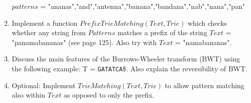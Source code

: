 \documentclass[11pt,runningheads,a4paper]{article}
\newcommand{\DNA}[1]{\texttt{\uppercase{#1}}}
\begin{document}
\begin{enumerate}
$patterns$ = "ananas","and","antenna","banana","bandana","nab","nana","pan"

\item Implement a function $PrefixTrieMatching(Text, Trie)$ which checks whether any string from $Patterns$ matches a prefix of the string $Text$ = "panamabananas" (see page 125). Also try with $Text$ = "namabananas".

  \item Discuss the main features of the Burrows-Wheeler transform (BWT) using the following example: T = \DNA{GATATCA}\$. 
    Also explain the reversibility of BWT.

\item Optional: Implement $TrieMatching(Text,Trie)$ to allow pattern matching also within $Text$ as opposed to only the prefix.

\end{enumerate}
    
\end{document}
